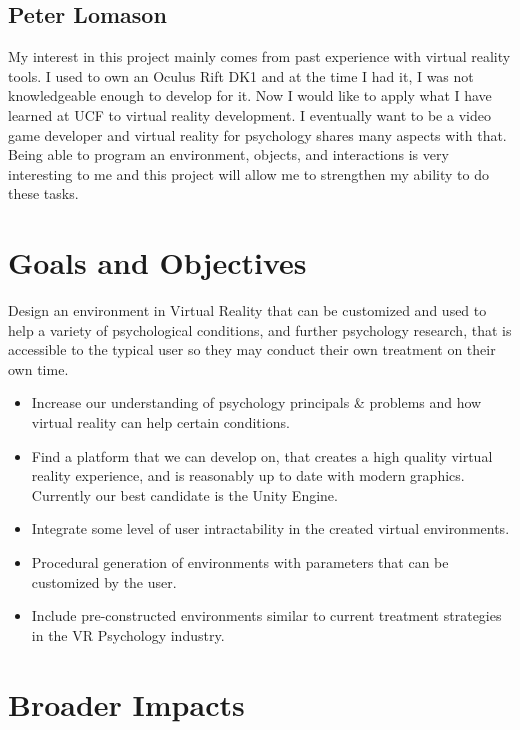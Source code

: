 \documentclass[a4paper,10pt]{article}
\begin{document}
	\subsection{Peter Lomason}
	My interest in this project mainly comes from past experience with virtual reality tools. I used to own an Oculus Rift DK1 and at the time I had it, 
	I was not knowledgeable enough to develop for it. Now I would like to apply what I have learned at UCF to virtual reality development. I eventually want to be
	a video game developer and virtual reality for psychology shares many aspects with that. Being able to program an environment, objects, and interactions is very
	interesting to me and this project will allow me to strengthen my ability to do these tasks.
	\pagebreak
	\section{Goals and Objectives}
	Design an environment in Virtual Reality that can be customized and used to help a variety of psychological conditions, and further psychology research, that is accessible to the typical user so they may conduct their own treatment on their own time.
	\begin{itemize}
		\item Increase our understanding of psychology principals \& problems and how virtual reality can help certain conditions.
		\item Find a platform that we can develop on, that creates a high quality virtual reality experience, and is reasonably up to date with modern graphics. Currently our best candidate is the Unity Engine.
		\item Integrate some level of user intractability in the created virtual environments. 
		\item Procedural generation of environments with parameters that can be customized by the user. 
		\item Include pre-constructed environments similar to current treatment strategies in the VR Psychology industry.
	\end{itemize}
	\section{Broader Impacts}
	
\end{document}
